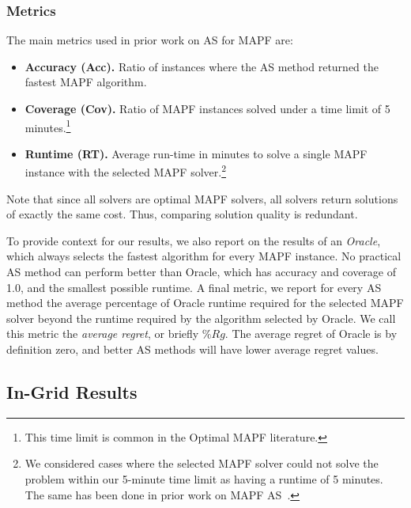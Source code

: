 \documentclass[letterpaper]{article} %
\begin{document}
\subsubsection{Metrics}
The main metrics used in prior work on AS for MAPF are:
\begin{itemize}
    \item \textbf{Accuracy (Acc).} Ratio of instances where the AS method returned the fastest MAPF algorithm. 
    \item \textbf{Coverage (Cov).} Ratio of MAPF instances solved under a time limit of 5 minutes.\footnote{This time limit is common in the Optimal MAPF literature.}
    \item \textbf{Runtime (RT).} Average run-time in minutes to solve a single MAPF instance with the selected MAPF solver.\footnote{We considered cases where the selected MAPF solver could not solve the problem within our 5-minute time limit as having a runtime of 5 minutes. The same has been done in prior work on MAPF AS~\cite{kaduri2020algorithm,ren2021mapfast}.}
\end{itemize}
Note that since all solvers are optimal MAPF solvers, all solvers return solutions of exactly the same cost. Thus, comparing solution quality is redundant. 

To provide context for our results, we also report on the results of an \emph{Oracle}, which always selects the fastest algorithm for every MAPF instance. No practical AS method can perform better than Oracle, which has accuracy and coverage of 1.0, and the smallest possible runtime. 
A final metric, we report for every AS method the average percentage of Oracle runtime required for the selected MAPF solver beyond the runtime required by the algorithm selected by Oracle. We call this metric the \emph{average regret}, or briefly $\%Rg$. 
The average regret of Oracle is by definition zero, and better AS methods will have lower average regret values. 



\subsection{In-Grid Results}
\end{document}
